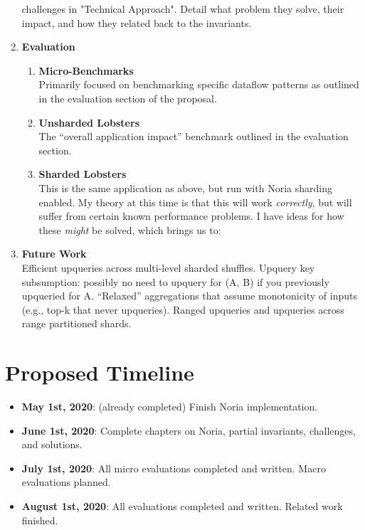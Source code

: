 \documentclass[12pt,letterpaper,twoside]{article}
\begin{document}
\begin{enumerate}
   challenges in "Technical Approach". Detail what problem they solve,
   their impact, and how they related back to the invariants.
 \item \textbf{Evaluation}
   \begin{enumerate}
   \item \textbf{Micro-Benchmarks}\\
     Primarily focused on benchmarking specific dataflow patterns as
     outlined in the evaluation section of the proposal.
   \item \textbf{Unsharded Lobsters}\\
     The ``overall application impact'' benchmark outlined in the
     evaluation section.
   \item \textbf{Sharded Lobsters}\\
     This is the same application as above, but run with Noria sharding
     enabled. My theory at this time is that this will work \emph{correctly},
     but will suffer from certain known performance problems. I have
     ideas for how these \emph{might} be solved, which brings us to:
   \end{enumerate}
 \item \textbf{Future Work}\\
   Efficient upqueries across multi-level sharded shuffles. Upquery key
   subsumption: possibly no need to upquery for (A, B) if you previously
   upqueried for A. ``Relaxed'' aggregations that assume monotonicity of
   inputs (e.g., top-k that never upqueries). Ranged upqueries and
   upqueries across range partitioned shards.
\end{enumerate}

\section{Proposed Timeline}

\begin{itemize}
 \item \textbf{May 1st, 2020}: (already completed) Finish Noria implementation.
 \item \textbf{June 1st, 2020}: Complete chapters on Noria, partial invariants, challenges, and solutions.
 \item \textbf{July 1st, 2020}: All micro evaluations completed and written. Macro evaluations planned.
 \item \textbf{August 1st, 2020}: All evaluations completed and written. Related work finished.
\end{itemize}

\printbibliography
\end{document}
